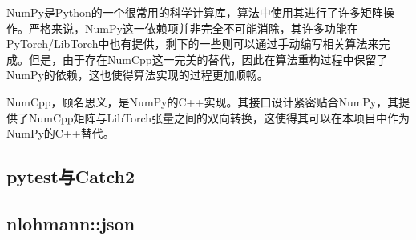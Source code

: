 NumPy\cite{harrisArrayProgrammingNumPy2020}是Python的一个很常用的科学计算库，算法中使用其进行了许多矩阵操作。严格来说，NumPy这一依赖项并非完全不可能消除，其许多功能在PyTorch/LibTorch中也有提供，剩下的一些则可以通过手动编写相关算法来完成。但是，由于存在NumCpp\cite{pilgerNumCppTemplatizedHeader2023}这一完美的替代，因此在算法重构过程中保留了NumPy的依赖，这也使得算法实现的过程更加顺畅。

NumCpp，顾名思义，是NumPy的C++实现。其接口设计紧密贴合NumPy，其提供了NumCpp矩阵与LibTorch张量之间的双向转换，这使得其可以在本项目中作为NumPy的C++替代。



\subsection{pytest与Catch2}\label{subsec:pytest-catch2}




\subsection{nlohmann::json}\label{subsec:nlohmann-json}


